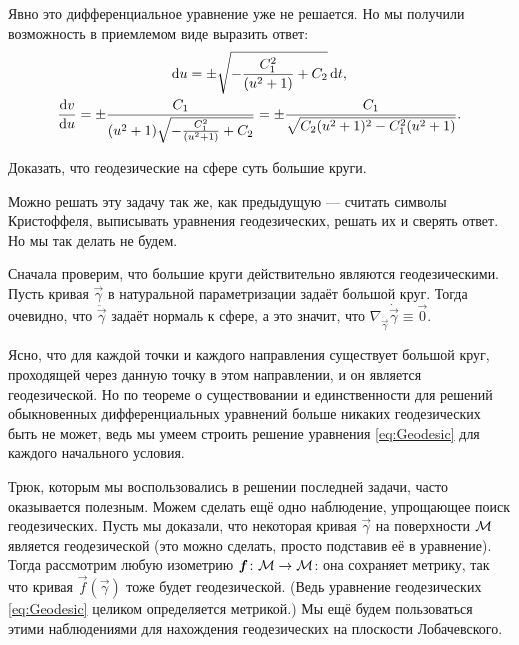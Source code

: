\begin{solution}
	Явно это дифференциальное уравнение уже не решается. Но мы получили возможность в приемлемом виде выразить ответ:
	\begin{gather*}
		\mathop{}\!\mathrm{d} u = \pm\sqrt{-\frac{C_1^2}{(u^2 + 1)} + C_2}\mathop{}\!\mathrm{d} t,\\
		\frac{\mathop{}\!\mathrm{d} v}{\mathop{}\!\mathrm{d} u} = \pm\frac{C_1}{(u^2 + 1)\sqrt{-\frac{C_1^2}{(u^2 + 1)} + C_2}} = \pm\frac{C_1}{\sqrt{C_2(u^2 + 1)^2 - C_1^2(u^2 + 1)}}.
	\end{gather*}
\end{solution}

\begin{problem} \label{eq:GeodesicSphere}
	Доказать, что геодезические на сфере суть большие круги.
\end{problem}

\begin{solution}
	Можно решать эту задачу так же, как предыдущую --- считать символы Кристоффеля, выписывать уравнения геодезических, решать их и сверять ответ. Но мы так делать не будем\footnotemark.


	Сначала проверим, что большие круги действительно являются геодезическими. Пусть кривая $\vec{\gamma}$ в натуральной параметризации задаёт большой круг. Тогда очевидно, что $\ddot{\vec{\gamma}}$ задаёт нормаль к сфере, а это значит, что $\nabla_{\dot{\vec{\gamma}}}\dot{\vec{\gamma}} \equiv \vec{0}$.

	Ясно, что для каждой точки и каждого направления существует большой круг, проходящей через данную точку в этом направлении, и он является геодезической. Но по теореме о существовании и единственности для решений обыкновенных дифференциальных уравнений больше никаких геодезических быть не может, ведь мы умеем строить решение уравнения \eqref{eq:Geodesic} для каждого начального условия.
\end{solution}

Трюк, которым мы воспользовались в решении последней задачи, часто оказывается полезным. Можем сделать ещё одно наблюдение, упрощающее поиск геодезических. Пусть мы доказали, что некоторая кривая $\vec{\gamma}$ на поверхности $\mathcal{M}$ является геодезической (это можно сделать, просто подставив её в уравнение). Тогда рассмотрим любую изометрию $\boldsymbol{f}\colon \mathcal{M} \to \mathcal{M}$: она сохраняет метрику, так что кривая $\vec{f}(\vec{\gamma})$ тоже будет геодезической. (Ведь уравнение геодезических \eqref{eq:Geodesic} целиком определяется метрикой.) Мы ещё будем пользоваться этими наблюдениями для нахождения геодезических на плоскости Лобачевского.

